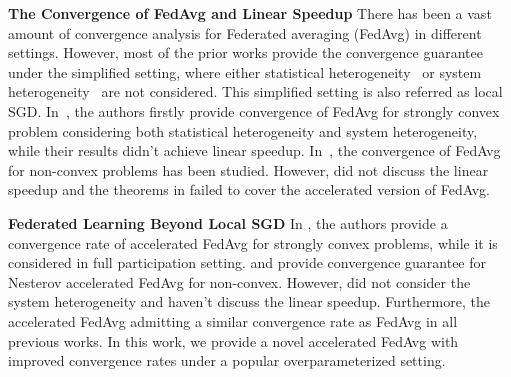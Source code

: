 \textbf{The Convergence of FedAvg and Linear Speedup}
There has been a vast amount of convergence analysis for Federated averaging
(FedAvg) in different settings. However, most of the prior works provide the
convergence guarantee under the simplified setting, where either statistical
heterogeneity~\cite{stich2018local} or system
heterogeneity~\cite{yu2019parallel,wang2019adaptive,khaled2019first} are not
considered. This simplified setting is also referred as local SGD. 
In~\cite{li2019convergence},
the authors firstly provide convergence of FedAvg for strongly convex problem considering both statistical heterogeneity and system heterogeneity, while their results
didn't achieve linear speedup. In~\cite{haddadpour2019convergence,liang2019variance,huo2020faster}, the convergence of FedAvg for non-convex problems has been studied. 
However, \cite{huo2020faster} did not discuss the linear speedup and the theorems in \cite{haddadpour2019convergence,liang2019variance} failed to cover the accelerated version of
FedAvg. 


\textbf{Federated Learning Beyond Local SGD}
In \cite{liu2019accelerating}, the authors provide a convergence rate of accelerated FedAvg for strongly convex problems, while it is considered in full participation setting.
\cite{yu2019linear} and \citep{huo2020faster} provide
convergence guarantee for Nesterov accelerated FedAvg for non-convex. 
However, \cite{yu2019linear} did not consider the system heterogeneity and \cite{huo2020faster} haven't discuss the linear speedup.
Furthermore, the accelerated FedAvg admitting a similar convergence rate as FedAvg in all previous works.  In this work, we provide a novel accelerated FedAvg with improved convergence rates under a popular overparameterized setting. 






